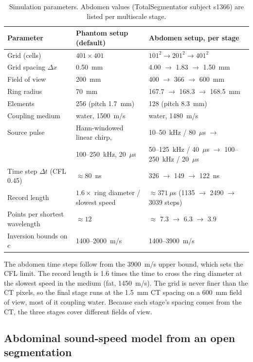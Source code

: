 \documentclass[11pt]{article}
\begin{document}
\begin{table}[ht]
\centering
\small
\caption{Simulation parameters. Abdomen values (TotalSegmentator subject
  s1366) are listed per multiscale stage.}
\label{tab:setup}
\begin{tabular}{@{}lll@{}}
\toprule
Parameter & Phantom setup (default) & Abdomen setup, per stage \\
\midrule
Grid (cells) & $401 \times 401$ & $101^2 \to 201^2 \to 401^2$ \\
Grid spacing $\Delta x$ & 0.50~mm & 4.00 $\to$ 1.83 $\to$ 1.50~mm \\
Field of view & 200~mm & 400 $\to$ 366 $\to$ 600~mm \\
Ring radius & 70~mm & 167.7 $\to$ 168.3 $\to$ 168.5~mm \\
Elements & 256 (pitch 1.7~mm) & 128 (pitch 8.3~mm) \\
Coupling medium & water, 1500~m/s & water, 1480~m/s \\
Source pulse & Hann-windowed linear chirp, & 10--50~kHz / 80~$\mu$s $\to$ \\
 & 100--250~kHz, 20~$\mu$s & 50--125~kHz / 40~$\mu$s $\to$ 100--250~kHz / 20~$\mu$s \\
Time step $\Delta t$ (CFL 0.45) & $\approx 80$~ns & 326 $\to$ 149 $\to$ 122~ns \\
Record length & $1.6\times$ ring diameter / slowest speed & $\approx 371~\mu$s (1135 $\to$ 2490 $\to$ 3039 steps) \\
Points per shortest wavelength & $\approx 12$ & $\approx$ 7.3 $\to$ 6.3 $\to$ 3.9 \\
Inversion bounds on $c$ & 1400--2000~m/s & 1400--3900~m/s \\
\bottomrule
\end{tabular}
\end{table}

The abdomen time steps follow from the 3900~m/s upper bound, which sets the CFL
limit. The record length is 1.6 times the time to cross the ring diameter at the
slowest speed in the medium (fat, 1450~m/s). The grid is never finer than the CT
pixels, so the final stage runs at the 1.5~mm CT spacing on a 600~mm field of
view, most of it coupling water. Because each stage's spacing comes from the
CT, the three stages cover different fields of view.

\subsection{Abdominal sound-speed model from an open segmentation}
\label{sec:totalseg}
\end{document}
